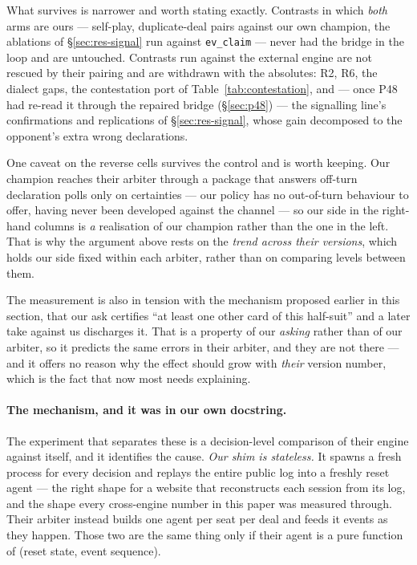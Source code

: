 \documentclass[11pt,letterpaper]{article}
\begin{document}
What survives is narrower and worth stating exactly. Contrasts in which
\emph{both} arms are ours --- self-play, duplicate-deal pairs against our own
champion, the ablations of \S\ref{sec:res-signal} run against
\texttt{ev\_claim} --- never had the bridge in the loop and are untouched.
Contrasts run against the external engine are not rescued by their pairing and
are withdrawn with the absolutes: R2, R6, the dialect gaps, the
contestation port of Table~\ref{tab:contestation}, and --- once P48 had
re-read it through the repaired bridge (\S\ref{sec:p48}) --- the signalling
line's confirmations and replications of \S\ref{sec:res-signal}, whose gain
decomposed to the opponent's extra wrong declarations.

One caveat on the reverse cells survives the control and is worth keeping.
Our champion reaches their arbiter through a package that answers off-turn
declaration polls only on certainties --- our policy has no out-of-turn
behaviour to offer, having never been developed against the channel --- so our
side in the right-hand columns is \emph{a} realisation of our champion rather
than the one in the left. That is why the argument above rests on the
\emph{trend across their versions}, which holds our side fixed within each
arbiter, rather than on comparing levels between them.

The measurement is also in tension with the mechanism proposed earlier in this
section, that our ask certifies ``at least one other card of this half-suit''
and a later take against us discharges it. That is a property of our
\emph{asking} rather than of our arbiter, so it predicts the same errors in
their arbiter, and they are not there --- and it offers no reason why the
effect should grow with \emph{their} version number, which is the fact that
now most needs explaining.

\paragraph{The mechanism, and it was in our own docstring.} The experiment that
separates these is a decision-level comparison of their engine against itself,
and it identifies the cause. \emph{Our shim is stateless.} It spawns a fresh
process for every decision and replays the entire public log into a freshly
reset agent --- the right shape for a website that reconstructs each session
from its log, and the shape every cross-engine number in this paper was
measured through. Their arbiter instead builds one agent per seat per deal and
feeds it events as they happen. Those two are the same thing only if their
agent is a pure function of (reset state, event sequence).
\end{document}
